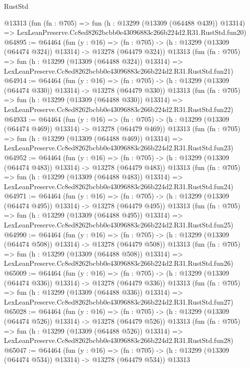 \begin{lexlean}{RustStd}
\begin{coremodule}
    @13313
    (fun (fn : @705) =>
    fun (h : @13299 (@13309 (@64488 @439)) @13314) =>
    LexLeanPreserve.Cc8ed8262bcbb0e43096883c266b224d2.R31.RustStd.fun20)
@64895 := @64464
    (fun (y : @16) =>
    (fn : @705) -> (h : @13299 (@13309 (@64474 @324)) @13314) -> @13278 (@64479 @324))
    @13313
    (fun (fn : @705) =>
    fun (h : @13299 (@13309 (@64488 @324)) @13314) =>
    LexLeanPreserve.Cc8ed8262bcbb0e43096883c266b224d2.R31.RustStd.fun21)
@64914 := @64464
    (fun (y : @16) =>
    (fn : @705) -> (h : @13299 (@13309 (@64474 @330)) @13314) -> @13278 (@64479 @330))
    @13313
    (fun (fn : @705) =>
    fun (h : @13299 (@13309 (@64488 @330)) @13314) =>
    LexLeanPreserve.Cc8ed8262bcbb0e43096883c266b224d2.R31.RustStd.fun22)
@64933 := @64464
    (fun (y : @16) =>
    (fn : @705) -> (h : @13299 (@13309 (@64474 @469)) @13314) -> @13278 (@64479 @469))
    @13313
    (fun (fn : @705) =>
    fun (h : @13299 (@13309 (@64488 @469)) @13314) =>
    LexLeanPreserve.Cc8ed8262bcbb0e43096883c266b224d2.R31.RustStd.fun23)
@64952 := @64464
    (fun (y : @16) =>
    (fn : @705) -> (h : @13299 (@13309 (@64474 @483)) @13314) -> @13278 (@64479 @483))
    @13313
    (fun (fn : @705) =>
    fun (h : @13299 (@13309 (@64488 @483)) @13314) =>
    LexLeanPreserve.Cc8ed8262bcbb0e43096883c266b224d2.R31.RustStd.fun24)
@64971 := @64464
    (fun (y : @16) =>
    (fn : @705) -> (h : @13299 (@13309 (@64474 @495)) @13314) -> @13278 (@64479 @495))
    @13313
    (fun (fn : @705) =>
    fun (h : @13299 (@13309 (@64488 @495)) @13314) =>
    LexLeanPreserve.Cc8ed8262bcbb0e43096883c266b224d2.R31.RustStd.fun25)
@64990 := @64464
    (fun (y : @16) =>
    (fn : @705) -> (h : @13299 (@13309 (@64474 @508)) @13314) -> @13278 (@64479 @508))
    @13313
    (fun (fn : @705) =>
    fun (h : @13299 (@13309 (@64488 @508)) @13314) =>
    LexLeanPreserve.Cc8ed8262bcbb0e43096883c266b224d2.R31.RustStd.fun26)
@65009 := @64464
    (fun (y : @16) =>
    (fn : @705) -> (h : @13299 (@13309 (@64474 @336)) @13314) -> @13278 (@64479 @336))
    @13313
    (fun (fn : @705) =>
    fun (h : @13299 (@13309 (@64488 @336)) @13314) =>
    LexLeanPreserve.Cc8ed8262bcbb0e43096883c266b224d2.R31.RustStd.fun27)
@65028 := @64464
    (fun (y : @16) =>
    (fn : @705) -> (h : @13299 (@13309 (@64474 @526)) @13314) -> @13278 (@64479 @526))
    @13313
    (fun (fn : @705) =>
    fun (h : @13299 (@13309 (@64488 @526)) @13314) =>
    LexLeanPreserve.Cc8ed8262bcbb0e43096883c266b224d2.R31.RustStd.fun28)
@65047 := @64464
    (fun (y : @16) =>
    (fn : @705) -> (h : @13299 (@13309 (@64474 @534)) @13314) -> @13278 (@64479 @534))
    @13313

\end{coremodule}
\end{lexlean}
